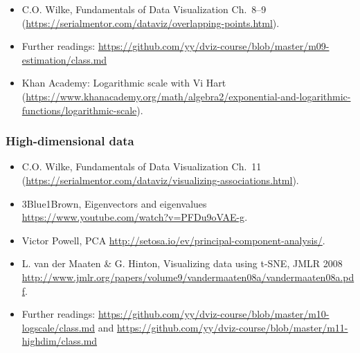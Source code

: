 \begin{itemize}\itemsep0em 
\item C.O. Wilke, Fundamentals of Data Visualization Ch.~8--9 (\url{https://serialmentor.com/dataviz/overlapping-points.html}). 
\item Further readings: \url{https://github.com/yy/dviz-course/blob/master/m09-estimation/class.md}
\item Khan Academy: Logarithmic scale with Vi Hart (\url{https://www.khanacademy.org/math/algebra2/exponential-and-logarithmic-functions/logarithmic-scale}). 
\end{itemize}	
\subsubsection{High-dimensional data }%

\begin{itemize}\itemsep0em 
\item C.O. Wilke, Fundamentals of Data Visualization Ch.~11 (\url{https://serialmentor.com/dataviz/visualizing-associations.html}). 
\item 3Blue1Brown, Eigenvectors and eigenvalues \url{https://www.youtube.com/watch?v=PFDu9oVAE-g}. 
\item Victor Powell, PCA \url{http://setosa.io/ev/principal-component-analysis/}.
\item L. van der Maaten \& G. Hinton, Visualizing data using t-SNE, JMLR 2008 \url{http://www.jmlr.org/papers/volume9/vandermaaten08a/vandermaaten08a.pdf}.
\item Further readings: \url{https://github.com/yy/dviz-course/blob/master/m10-logscale/class.md} and \url{https://github.com/yy/dviz-course/blob/master/m11-highdim/class.md}
\end{itemize}	


